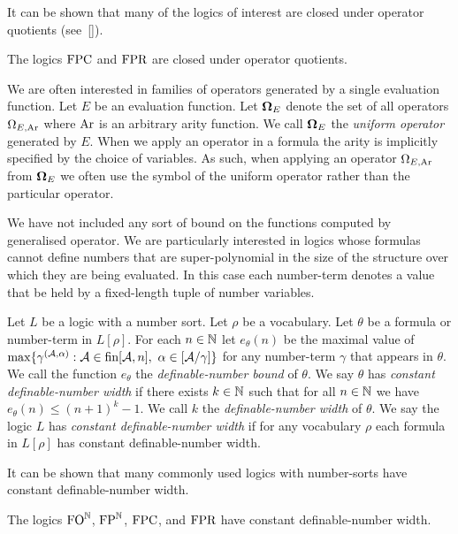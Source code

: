 \documentclass[../main/thesis.tex]{subfiles}
\begin{document}
It can be shown that many of the logics of interest are closed under operator
quotients (see~\ref{}).

\begin{lem}
  The logics $\text{\upshape FPC}$ and $\text{\upshape FPR}$ are closed under operator quotients.
  \label{lem:logics-operator-quotients}
\end{lem}

We are often interested in families of operators generated by a single
evaluation function. Let $E$ be an evaluation function. Let $\mathbf{\mathbf{\Omega}}_E$ denote
the set of all operators $\Omega_{E, \text{\upshape Ar}}$ where $\text{\upshape Ar}$ is an arbitrary arity
function. We call $\mathbf{\mathbf{\Omega}}_E$ the \emph{uniform operator} generated by $E$. When
we apply an operator in a formula the arity is implicitly specified by the
choice of variables. As such, when applying an operator $\Omega_{E, \text{\upshape Ar}}$ from
$\mathbf{\mathbf{\Omega}}_E$ we often use the symbol of the uniform operator rather than the
particular operator.

We have not included any sort of bound on the functions computed by generalised
operator. We are particularly interested in logics whose formulas cannot define
numbers that are super-polynomial in the size of the structure over which they
are being evaluated. In this case each number-term denotes a value that be held
by a fixed-length tuple of number variables.

\begin{definition}
  Let $L$ be a logic with a number sort. Let $\rho$ be a vocabulary. Let
  $\theta$ be a formula or number-term in $L[\rho]$. For each $n \in \mathbb{N}$ let
  $e_{\theta}(n) $ be the maximal value of $\max\{\gamma^{(\mathcal{A}, \alpha)}
  : \mathcal{A} \in \text{\upshape fin}{[\mathcal{A}, n]} , \,\, \alpha \in
  [\mathcal{A}/\gamma]\}$ for any number-term $\gamma$ that appears in
  $\theta$. We call the function $e_{\theta}$ the \emph{definable-number bound}
  of $\theta$. We say $\theta$ has \emph{constant definable-number width} if
  there exists $k \in \mathbb{N}$ such that for all $n \in \mathbb{N}$ we have
  $e_{\theta}(n) \leq (n+1)^k - 1$. We call $k$ the \emph{definable-number
    width} of $\theta$. We say the logic $L$ has \emph{constant definable-number
    width} if for any vocabulary $\rho$ each formula in $L[\rho]$ has constant
  definable-number width.
\end{definition}

It can be shown that many commonly used logics with number-sorts have constant
definable-number width.

\begin{lem}
  The logics $\text{\upshape FO}^{\mathbb{N}}$, $\text{\upshape FP}^{\mathbb{N}}$, $\text{\upshape FPC}$, and $\text{\upshape FPR}$ have constant
  definable-number width.
  \label{lem:logics-constant-number-width}
\end{lem}
\end{document}
